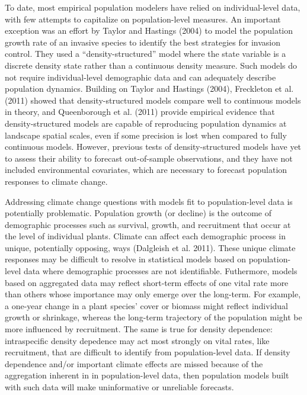 \documentclass[12pt,]{article}
\begin{document}
To date, most empirical population modelers have relied on
individual-level data, with few attempts to capitalize on
population-level measures. An important exception was an effort by
Taylor and Hastings (2004) to model the population growth rate of an
invasive species to identify the best strategies for invasion control.
They used a ``density-structured'' model where the state variable is a
discrete density state rather than a continuous density measure. Such
models do not require individual-level demographic data and can
adequately describe population dynamics. Building on Taylor and Hastings
(2004), Freckleton et al. (2011) showed that density-structured models
compare well to continuous models in theory, and Queenborough et al.
(2011) provide empirical evidence that density-structured models are
capable of reproducing population dynamics at landscape spatial scales,
even if some precision is lost when compared to fully continuous models.
However, previous tests of density-structured models have yet to assess
their ability to forecast out-of-sample observations, and they have not
included environmental covariates, which are necessary to forecast
population responses to climate change.

Addressing climate change questions with models fit to population-level
data is potentially problematic. Population growth (or decline) is the
outcome of demographic processes such as survival, growth, and
recruitment that occur at the level of individual plants. Climate can
affect each demographic process in unique, potentially opposing, ways
(Dalgleish et al. 2011). These unique climate responses may be difficult
to resolve in statistical models based on population-level data where
demographic processes are not identifiable. Futhermore, models based on
aggregated data may reflect short-term effects of one vital rate more
than others whose importance may only emerge over the long-term. For
example, a one-year change in a plant species' cover or biomass might
reflect individual growth or shrinkage, whereas the long-term trajectory
of the population might be more influenced by recruitment. The same is
true for density dependence: intraspecific density depedence may act
most strongly on vital rates, like recruitment, that are difficult to
identify from population-level data. If density dependence and/or
important climate effects are missed because of the aggregation inherent
in in population-level data, then population models built with such data
will make uninformative or unreliable forecasts.
\end{document}
